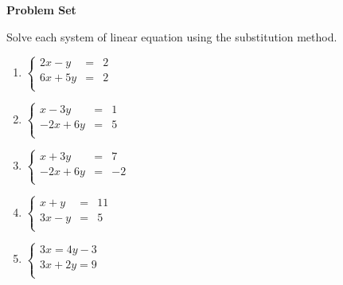 \textbf{Problem Set}

\vspce

Solve each system of linear equation using the substitution method. 

\begin{enumerate}[label = \arabic*. ]

\item \hspce $%
\left\{
\begin{array}{ccl}
2x-y & = & 2 \\
6x+5y & = & 2 \\
\end{array}
\right. $
\vspce 
\item \hspce $%
\left\{
\begin{array}{ccl}
x-3y & = & 1 \\
-2x+6y & = & 5 \\
\end{array}
\right. $
\vspce 
\item \hspce $%
\left\{
\begin{array}{ccl}
x+3y & = & 7 \\
-2x+6y & = & -2 \\
\end{array}
\right. $
\vspce 
\item \hspce $%
\left\{
\begin{array}{ccl}
x+y & = & 11 \\
3x-y & = & 5 \\
\end{array}
\right. 
$
\vspce 
\item \hspce $%
\left\{
\begin{array}{l}
3x =  4y-3 \\
3x+2y  =  9\\
\end{array}
\right. $

\end{enumerate}